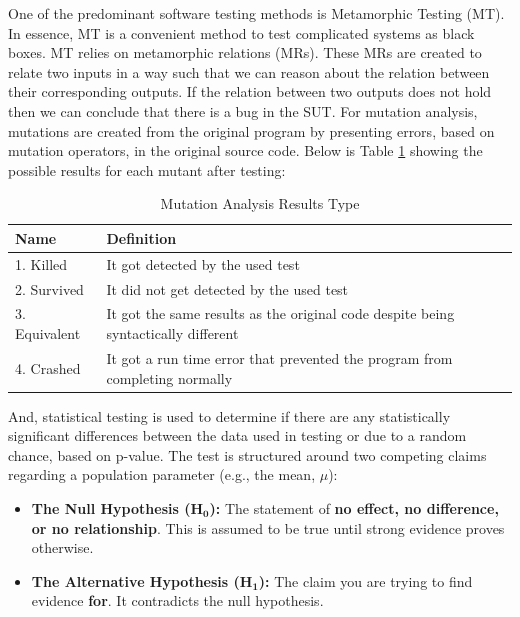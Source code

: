 \documentclass[12pt,a4paper]{article}
\begin{document}
	One of the predominant software testing methods is Metamorphic Testing (MT). In essence, MT is a convenient method to test complicated systems as black boxes. MT relies on metamorphic relations (MRs). These MRs are created to relate two inputs in a way such that we can reason about the relation between their corresponding outputs. If the relation between two outputs does not hold then we can conclude that there is a bug in the SUT. For mutation analysis, mutations are created from the original program by presenting errors, based on mutation operators, in the original source code. Below is Table \ref{tab:mutation_analysis} showing the possible results for each mutant after testing:
	
	\begin{table}[h!]
		\centering
		\caption{Mutation Analysis Results Type}
		\label{tab:mutation_analysis}
		\begin{tabular}{|l|l|}
			\hline
			\textbf{Name} & \textbf{Definition} \\
			\hline
			1. Killed & It got detected by the used test \\
			2. Survived & It did not get detected by the used test\\
			3. Equivalent & It got the same results as the original code despite being syntactically different \\
			4. Crashed & It got a run time error that prevented the program from completing normally \\
			\hline
		\end{tabular}
	\end{table}
	
	And, statistical testing is used to determine if there are any statistically significant differences between the data used in testing or due to a random chance, based on p-value. The test is structured around two competing claims regarding a population parameter (e.g., the mean, $\mu$):
	
	\begin{itemize}
		\item[$\bullet$] \textbf{The Null Hypothesis ($\mathbf{H_0}$):} The statement of \textbf{no effect, no difference, or no relationship}. This is assumed to be true until strong evidence proves otherwise.
		\item[$\bullet$] \textbf{The Alternative Hypothesis ($\mathbf{H_1}$):} The claim you are trying to find evidence \textbf{for}. It contradicts the null hypothesis.
	\end{itemize}
	
\end{document}
